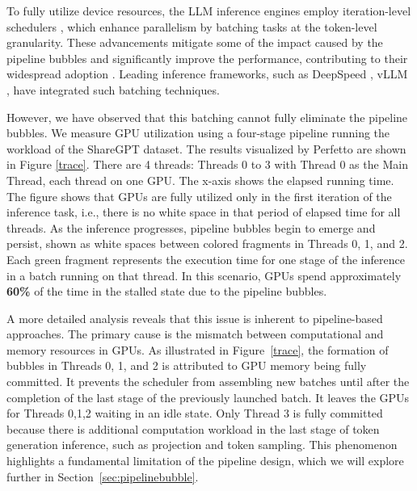 To fully utilize device resources, the LLM inference engines employ iteration-level schedulers \cite{yu2022orca}, which enhance parallelism by batching tasks at the token-level granularity. 
These advancements mitigate some of the impact caused by the pipeline bubbles and significantly improve the performance, contributing to their widespread adoption \cite{patel2024splitwise, jin2023s, qin2024mooncake}. 
Leading inference frameworks, such as DeepSpeed \cite{aminabadi2022deepspeed}, vLLM \cite{kwon2023efficient}, have integrated such batching techniques.




However, we have observed that this batching cannot fully eliminate the pipeline bubbles. 
We measure GPU utilization using a four-stage pipeline running the workload of the ShareGPT dataset\cite{chiang2023vicuna}. 
The results visualized by Perfetto\cite{perfetto2021} are shown in Figure \ref{trace}.  
There are 4 threads: Threads 0 to 3 with Thread 0 as the Main Thread, each thread on one GPU.
The x-axis shows the elapsed running time.
The figure shows that GPUs are fully utilized only in the first iteration of the inference task, i.e., there is no white space in that period of elapsed time for all threads.
As the inference progresses, pipeline bubbles begin to emerge and persist, shown as white spaces between colored fragments in Threads 0, 1, and 2. Each green fragment represents the execution time for one stage of the inference in a batch running on that thread.
In this scenario, GPUs spend approximately \textbf{60\%} of the time in the stalled state due to the pipeline bubbles. 



A more detailed analysis reveals that this issue is inherent to pipeline-based approaches. 
The primary cause is the mismatch between computational and memory resources in GPUs. 
As illustrated in Figure~\ref{trace}, the formation of bubbles in Threads 0, 1, and 2 is attributed to GPU memory being fully committed.
It prevents the scheduler from assembling new batches until after the completion of the last stage of the previously launched batch. 
It leaves the GPUs for Threads 0,1,2 waiting in an idle state.
Only Thread 3 is fully committed because there is additional computation workload in the last stage of token generation inference, such as projection and token sampling.
This phenomenon highlights a fundamental limitation of the pipeline design, which we will explore further in Section~\ref{sec:pipelinebubble}.

